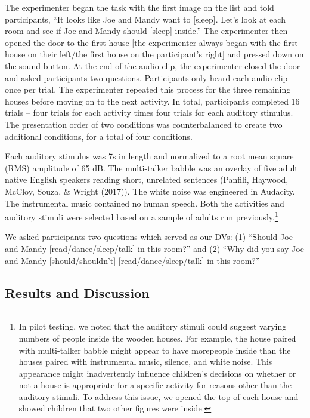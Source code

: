\documentclass[10pt, letterpaper]{article}
\begin{document}
The experimenter began the task with the first image on the list and
told participants, ``It looks like Joe and Mandy want to {[}sleep{]}.
Let's look at each room and see if Joe and Mandy should {[}sleep{]}
inside.'' The experimenter then opened the door to the first house
{[}the experimenter always began with the first house on their left/the
first house on the participant's right{]} and pressed down on the sound
button. At the end of the audio clip, the experimenter closed the door
and asked participants two questions. Participants only heard each audio
clip once per trial. The experimenter repeated this process for the
three remaining houses before moving on to the next activity. In total,
participants completed 16 trials -- four trials for each activity times
four trials for each auditory stimulus. The presentation order of two
conditions was counterbalanced to create two additional conditions, for
a total of four conditions.

Each auditory stimulus was 7s in length and normalized to a root mean
square (RMS) amplitude of 65 dB. The multi-talker babble was an overlay
of five adult native English speakers reading short, unrelated sentences
(Panfili, Haywood, McCloy, Souza, \& Wright (2017)). The white noise was
engineered in Audacity. The instrumental music contained no human
speech. Both the activities and auditory stimuli were selected based on
a sample of adults run
previously.\footnote{In pilot testing, we noted that the auditory stimuli could suggest varying numbers of people inside the wooden houses. For example, the house paired with multi-talker babble might appear to have morepeople inside than the houses paired with instrumental music, silence, and white noise. This appearance might inadvertently influence children's decisions on whether or not a house is appropriate for a specific activity for reasons other than the auditory stimuli. To address this issue, we opened the top of each house and showed children that two other figures were inside.}

We asked participants two questions which served as our DVs: (1)
``Should Joe and Mandy {[}read/dance/sleep/talk{]} in this room?'' and
(2) ``Why did you say Joe and Mandy {[}should/shouldn't{]}
{[}read/dance/sleep/talk{]} in this room?''

\hypertarget{results-and-discussion}{%
\subsection{Results and Discussion}\label{results-and-discussion}}
\end{document}
